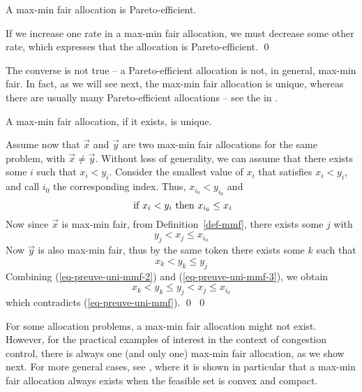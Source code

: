 \begin{theorem}A max-min fair allocation is Pareto-efficient.
\end{theorem}
\pr If we increase one rate in a max-min fair allocation, we must decrease some other rate, which expresses that the allocation is Pareto-efficient.
\qed

The converse is not true -- a Pareto-efficient allocation is not, in general, max-min fair. In fact, as we will see next, the max-min fair allocation is unique, whereas there are usually many Pareto-efficient allocations -- see the in .

\begin{theorem}A max-min fair allocation, if it exists, is unique.
\end{theorem}
\pr Assume now that
$\vec{x}$ and $\vec{y}$ are two max-min fair allocations for
the same problem, with $\vec{x} \neq \vec{y}$. Without loss of
generality, we can assume that there exists some $i$ such that
$x_{i} < y_{i}$. Consider the smallest value of $x_{i}$ that
satisfies  $x_{i} < y_{i}$, and call $i_{0}$ the corresponding
index. Thus, $x_{i_{0}} < y_{i_{0}}$ and
\begin{equation}
        \textrm{ if }  x_{i} < y_{i} \textrm{ then } x_{i_{0}} \leq x_{i}
        \label{eq-preuve-uni-mmf}
\end{equation}
Now since $\vec{x}$ is max-min fair, from
Definition~\ref{def-mmf}, there exists some $j$ with
\begin{equation}
        y_{j}<x_{j} \leq x_{i_{0}}
        \label{eq-preuve-uni-mmf-2}
\end{equation}
Now $\vec{y}$ is also max-min fair, thus by the same token
there exists some $k$ such that
\begin{equation}
        x_{k}<y_{k} \leq y_{j}
        \label{eq-preuve-uni-mmf-3}
\end{equation}
Combining (\ref{eq-preuve-uni-mmf-2}) and
(\ref{eq-preuve-uni-mmf-3}), we obtain
$$
x_{k}<y_{k} \leq y_{j}<x_{j} \leq x_{i_{0}}
$$
which contradicts (\ref{eq-preuve-uni-mmf}). \qed
\qed

For some allocation problems, a max-min fair allocation might
not exist. However, for the practical examples of interest in the context of congestion control, there is always one (and only one) max-min fair allocation, as we show next. For more general cases,
see \cite{radunovic2007ufm}, where it is shown in particular that a max-min fair allocation always exists when the feasible set is convex and compact.

